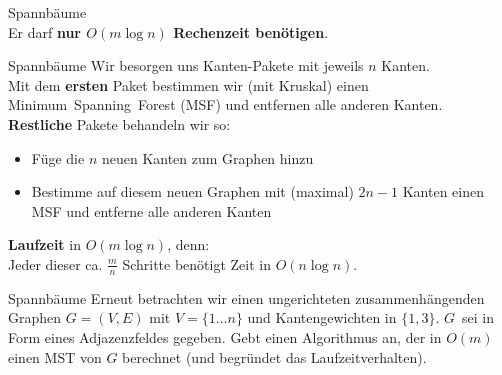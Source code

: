 \begin{frame}{Spannbäume}
	 \\
	Er darf \textbf{nur $O(m \log n)$ Rechenzeit benötigen}.
\end{frame}

\begin{frame}{Spannbäume}
	\solutionheading
	Wir besorgen uns Kanten-Pakete mit jeweils $n$ Kanten. \\
	Mit dem \textbf{ersten} Paket bestimmen wir (mit Kruskal) einen Minimum~Spanning~Forest (MSF) und entfernen alle anderen Kanten. \\
	\textbf{Restliche} Pakete behandeln wir so: \\
	\begin{itemize}
		\item Füge die $n$ neuen Kanten zum Graphen hinzu
		\item Bestimme auf diesem neuen Graphen mit (maximal) $2n-1$ Kanten einen MSF und entferne alle anderen Kanten
	\end{itemize}
	\impl \textbf{Laufzeit} in $O(m \log n)$, denn: \\
	Jeder dieser ca. $\frac{m}{n}$ Schritte benötigt Zeit in $O(n \log n)$.
\end{frame}

\begin{frame}{Spannbäume}
	Erneut betrachten wir einen ungerichteten zusammenhängenden Graphen $G = (V, E)$ mit $V = \{1...n\}$ und Kantengewichten in $\{1, 3\}$. $G$~sei in Form eines Adjazenzfeldes gegeben. Gebt einen Algorithmus an, der in $O(m)$ einen MST von $G$ berechnet (und begründet das Laufzeitverhalten).
\end{frame}


